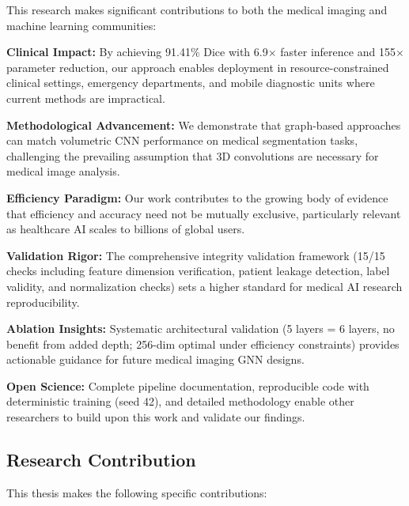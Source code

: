 This research makes significant contributions to both the medical imaging and machine learning communities:

\textbf{Clinical Impact:} By achieving 91.41\% Dice with 6.9$\times$ faster inference and 155$\times$ parameter reduction, our approach enables deployment in resource-constrained clinical settings, emergency departments, and mobile diagnostic units where current methods are impractical.

\textbf{Methodological Advancement:} We demonstrate that graph-based approaches can match volumetric CNN performance on medical segmentation tasks, challenging the prevailing assumption that 3D convolutions are necessary for medical image analysis.

\textbf{Efficiency Paradigm:} Our work contributes to the growing body of evidence that efficiency and accuracy need not be mutually exclusive, particularly relevant as healthcare AI scales to billions of global users.

\textbf{Validation Rigor:} The comprehensive integrity validation framework (15/15 checks including feature dimension verification, patient leakage detection, label validity, and normalization checks) sets a higher standard for medical AI research reproducibility.

\textbf{Ablation Insights:} Systematic architectural validation (5 layers = 6 layers, no benefit from added depth; 256-dim optimal under efficiency constraints) provides actionable guidance for future medical imaging GNN designs.

\textbf{Open Science:} Complete pipeline documentation, reproducible code with deterministic training (seed 42), and detailed methodology enable other researchers to build upon this work and validate our findings.

\subsection{Research Contribution}

This thesis makes the following specific contributions:

